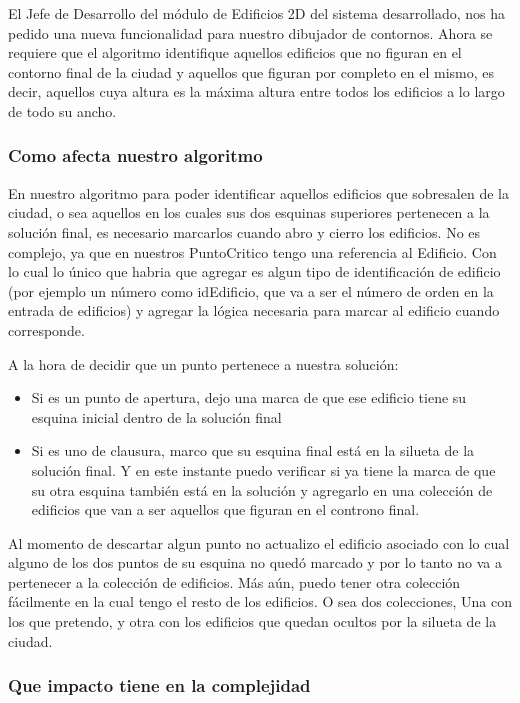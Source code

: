 
El Jefe de Desarrollo del módulo de Edificios 2D del sistema desarrollado, nos ha pedido una nueva funcionalidad para nuestro dibujador de contornos. Ahora se requiere que el algoritmo identifique aquellos edificios que no figuran en el contorno final de la ciudad y aquellos que figuran por completo en el mismo, es decir, aquellos cuya altura es la máxima altura entre todos los edificios a lo largo de todo su ancho.

\subsubsection*{Como afecta nuestro algoritmo}

En nuestro algoritmo para poder identificar aquellos edificios que sobresalen de la ciudad, o sea aquellos en los cuales sus dos esquinas superiores pertenecen a la solución final, es necesario marcarlos cuando abro y cierro los edificios.
No es complejo, ya que en nuestros PuntoCritico tengo una referencia al Edificio. Con lo cual lo único que habria que agregar es algun tipo de identificación de edificio (por ejemplo un número como idEdificio, que va a ser el número de orden en la entrada de edificios) y agregar la lógica necesaria para marcar al edificio cuando corresponde.

A la hora de decidir que un punto pertenece a nuestra solución:
\begin{itemize}
	\item Si es un punto de apertura, dejo una marca de que ese edificio tiene su esquina inicial dentro de la solución final
	\item Si es uno de clausura, marco que su esquina final está en la silueta de la solución final. Y en este instante puedo verificar si ya tiene la marca de que su otra esquina también está en la solución y agregarlo en una colección de edificios que van a ser aquellos que figuran en el controno final.
\end{itemize}

Al momento de descartar algun punto no actualizo el edificio asociado con lo cual alguno de los dos puntos de su esquina no quedó marcado y por lo tanto no va a pertenecer a la colección de edificios. Más aún, puedo tener otra colección fácilmente en la cual tengo el resto de los edificios. O sea dos colecciones, Una con los que pretendo, y otra con los edificios que quedan ocultos por la silueta de la ciudad.


\subsubsection*{Que impacto tiene en la complejidad}

